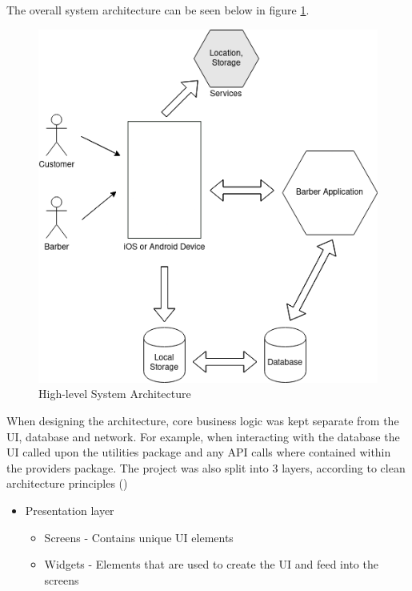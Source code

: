 \documentclass[12pt]{article}
\begin{document}
	The overall system architecture can be seen below in figure \ref{fig:system-architecture}.
	
	\begin{figure}[H]
		\centering
		\includegraphics[scale=0.7]{images/system-architecture.png}
		\caption{High-level System Architecture}
		\label{fig:system-architecture}
	\end{figure}
	
	When designing the architecture, core business logic was kept separate from the UI, database and network. For example, when interacting with the database the UI called upon the utilities package and any API calls where contained within the providers package. The project was also split into 3 layers, according to clean architecture principles (\cite{martinRapidApplicationDevelopment1991})
	
	\begin{itemize}
		\item Presentation layer
		\begin{itemize}
			\item Screens - Contains unique UI elements
			\item Widgets - Elements that are used to create the UI and feed into the screens
		\end{itemize}
	\end{itemize}
	
\end{document}

